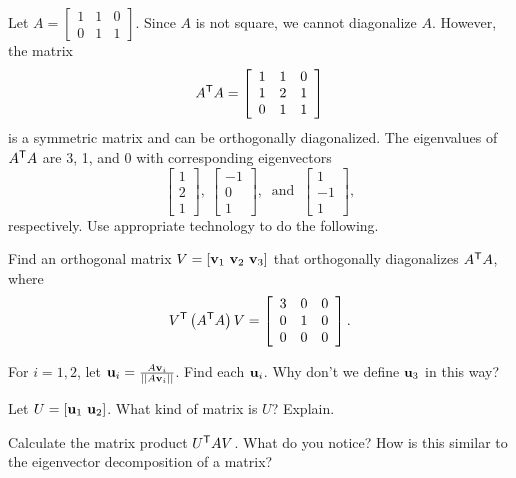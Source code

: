\begin{pa} \label{pa:7_c_2} Let $A = \left[ \begin{array}{ccc} 1&1&0\\ 0&1&1 \end{array} \right]$. Since $A$ is not square, we cannot diagonalize $A$. However, the matrix
\[A^{\mathsf{T}}A = \left[ \begin{array}{ccc} 1&1&0 \\ 1&2&1 \\ 0&1&1 \end{array} \right]\]
is a symmetric matrix and can be orthogonally diagonalized. The eigenvalues of $A^{\mathsf{T}}A$ are 3, 1, and 0 with corresponding eigenvectors
\[\left[ \begin{array}{c} 1\\2\\1 \end{array} \right], \ \left[ \begin{array}{r} -1\\0\\1 \end{array} \right], \ \text{ and } \ \left[ \begin{array}{r} 1\\-1\\1 \end{array} \right],\]
respectively. Use appropriate technology to do the following. 
\be
\item Find an orthogonal matrix $V = [\vv_1 \ \vv_2 \ \vv_3]$ that orthogonally diagonalizes $A^{\mathsf{T}}A$, where
\[V^{\mathsf{T}}\left(A^{\mathsf{T}}A\right)V = \left[ \begin{array}{ccc} 3&0&0\\0&1&0\\0&0&0 \end{array} \right].\]


\item For $i=1,2$, let $\mathbf{u}_i = \frac{A \mathbf{v}_i}{||A \mathbf{v}_i||}$. Find each $\mathbf{u}_i$. Why don't we define $\mathbf{u}_3$ in this way?


\item Let $U = [\mathbf{u}_1 \ \mathbf{u}_2]$. What kind of matrix is $U$? Explain.


\item  Calculate the matrix product $U^{\mathsf{T}}AV$. What do you notice? How is this similar to the eigenvector decomposition of a matrix?

 
\ee
\end{pa}


